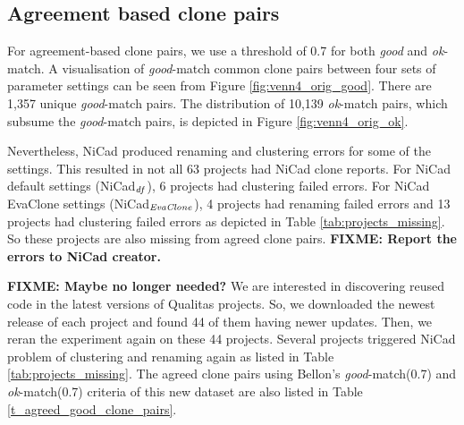 \documentclass{sig-alternate-05-2015}
\newcommand\FIXME[1]{\textbf{FIXME: #1}}
\begin{document}
\subsection{Agreement based clone pairs}

For agreement-based clone pairs, we use a threshold of 0.7 for both \textit{good} and \textit{ok}-match. A visualisation of \textit{good}-match common clone pairs between four sets of parameter settings can be seen from Figure \ref{fig:venn4_orig_good}. There are 1,357 unique \textit{good}-match pairs. The distribution of 10,139 \textit{ok}-match pairs, which subsume the \textit{good}-match pairs, is depicted in Figure \ref{fig:venn4_orig_ok}.

Nevertheless,  NiCad produced renaming and clustering errors for some of the settings. This resulted in not all 63 projects had NiCad clone reports. For NiCad default settings (NiCad$_{\textrm{\textit{df}}}$), 6 projects had clustering failed errors. For NiCad EvaClone settings (NiCad$_{\textrm{\textit{EvaClone}}}$), 4 projects had renaming failed errors and 13 projects had clustering failed errors as depicted in Table \ref{tab:projects_missing}. So these projects are also missing from agreed clone pairs. \FIXME{Report the errors to NiCad creator.}

\FIXME{Maybe no longer needed?} We are interested in discovering reused code in the latest versions of Qualitas projects. So, we downloaded the newest release of each project and found 44 of them having newer updates. Then, we reran the experiment again on these 44 projects. Several projects triggered NiCad problem of clustering and renaming again as listed in Table \ref{tab:projects_missing}. The agreed clone pairs using Bellon's \textit{good}-match(0.7) and \textit{ok}-match(0.7) criteria of this new dataset are also listed in Table \ref{t_agreed_good_clone_pairs}. 
\end{document}
